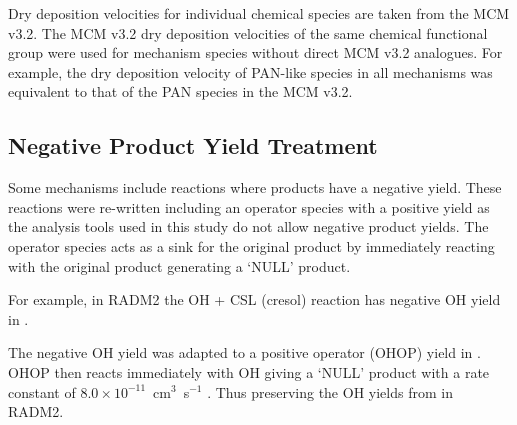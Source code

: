 Dry deposition velocities for individual chemical species are taken from the MCM v3.2. 
The MCM v3.2 dry deposition velocities of the same chemical functional group were used for mechanism species without direct MCM v3.2 analogues. 
For example, the dry deposition velocity of PAN-like species in all mechanisms was equivalent to that of the PAN species in the MCM v3.2.

\subsection{Negative Product Yield Treatment}

Some mechanisms include reactions where products have a negative yield. 
These reactions were re-written including an operator species with a positive yield as the analysis tools used in this study do not allow negative product yields. 
The operator species acts as a sink for the original product by immediately reacting with the original product generating a `NULL' product. 

For example, in RADM2 the OH + CSL (cresol) reaction has negative OH yield in  \citep{Stockwell:1990}.
\begin{reactionlist}
\end{reactionlist}
The negative OH yield was adapted to a positive operator (OHOP) yield in .
OHOP then reacts immediately with OH giving a `NULL' product with a rate constant of \mbox{$8.0 \times 10^{-11}$ cm$^3$ s$^{-1}$} . 
Thus preserving the OH yields from  in RADM2.
\begin{reactionlist}
\end{reactionlist}
